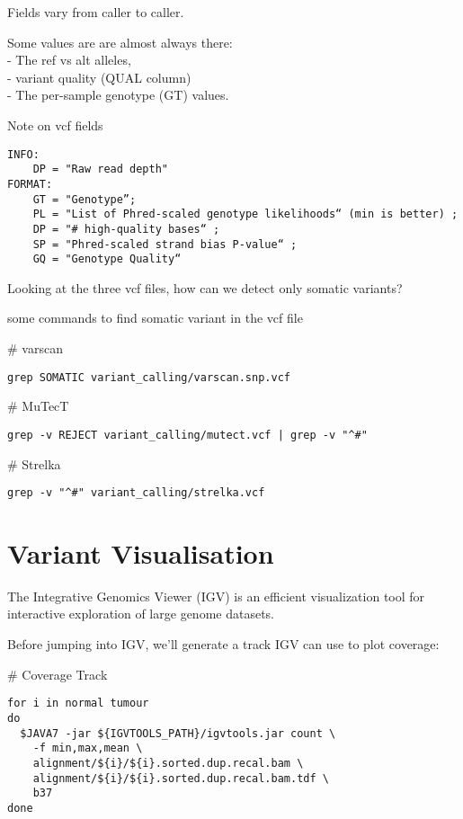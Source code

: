 Fields vary from caller to caller.
 
Some values are are almost always there: \\
   - The ref vs alt alleles, \\
   - variant quality (QUAL column) \\
   - The per-sample genotype (GT) values.

Note on vcf fields
\begin{verbatim}
INFO: 
	DP = "Raw read depth"
FORMAT:
	GT = "Genotype”; 
	PL = "List of Phred-scaled genotype likelihoods“ (min is better) ; 
	DP = "# high-quality bases“ ; 
	SP = "Phred-scaled strand bias P-value“ ; 
	GQ = "Genotype Quality“
\end{verbatim}

\begin{questions}
Looking at the three vcf files, how can we detect only somatic variants?
\end{questions}
\begin{answer}
some commands to find somatic variant in the vcf file

\# varscan
\begin{lstlisting}
grep SOMATIC variant_calling/varscan.snp.vcf 
\end{lstlisting}

\# MuTecT
\begin{lstlisting}
grep -v REJECT variant_calling/mutect.vcf | grep -v "^#"
\end{lstlisting}

\# Strelka
\begin{lstlisting}
grep -v "^#" variant_calling/strelka.vcf
\end{lstlisting}
\end{answer}


\newpage

\section{Variant Visualisation}

The Integrative Genomics Viewer (IGV) is an efficient visualization tool for interactive exploration of large genome datasets. 

Before jumping into IGV, we'll generate a track IGV can use to plot coverage:

\# Coverage Track
\begin{lstlisting}
for i in normal tumour
do
  $JAVA7 -jar ${IGVTOOLS_PATH}/igvtools.jar count \
    -f min,max,mean \
    alignment/${i}/${i}.sorted.dup.recal.bam \
    alignment/${i}/${i}.sorted.dup.recal.bam.tdf \
    b37
done
\end{lstlisting}

